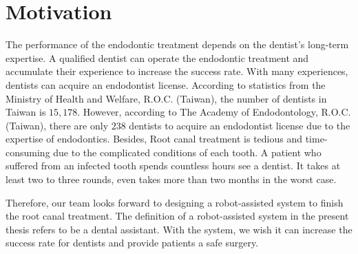 \section{Motivation}
\hspace*{6mm}The performance of the endodontic treatment depends on the dentist's long-term expertise. A qualified dentist can operate the endodontic treatment and accumulate their experience to increase the success rate. With many experiences, dentists can acquire an endodontist license. According to statistics from the Ministry of Health and Welfare, R.O.C. (Taiwan), the number of dentists in Taiwan is $15,178$. However, according to The Academy of Endodontology, R.O.C. (Taiwan), there are only $238$ dentists to acquire an endodontist license due to the expertise of endodontics. Besides, Root canal treatment is tedious and time-consuming due to the complicated conditions of each tooth. A patient who suffered from an infected tooth spends countless hours see a dentist. It takes at least two to three rounds, even takes more than two months in the worst case. 
\par
Therefore, our team looks forward to designing a robot-assisted system to finish the root canal treatment. The definition of a robot-assisted system in the present thesis refers to be a dental assistant. With the system, we wish it can increase the success rate for dentists and provide patients a safe surgery.

